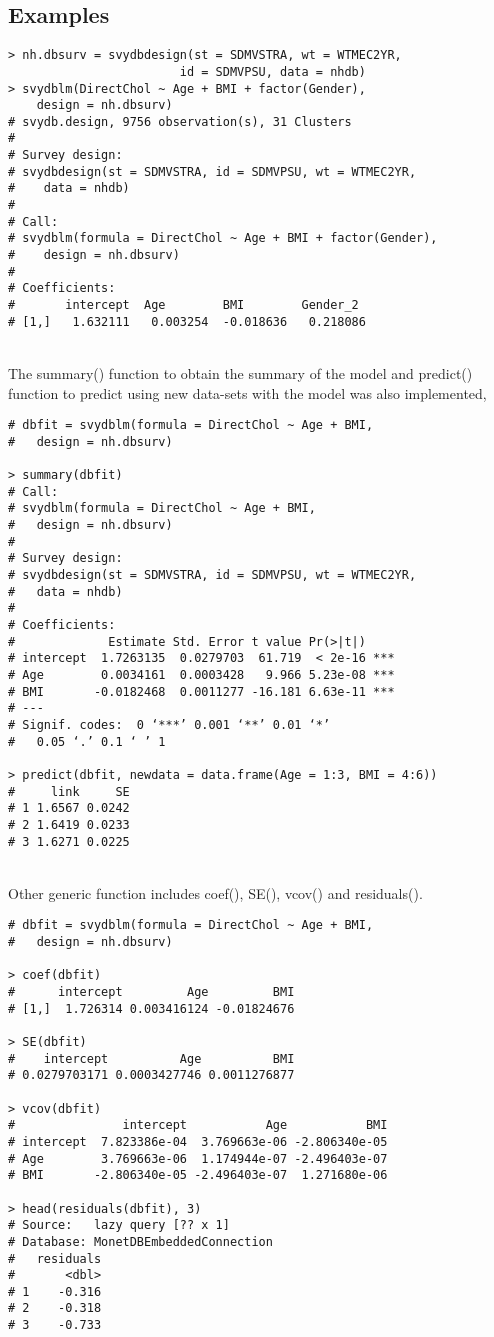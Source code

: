 \newpage
\subsection{Examples}
\begin{lstlisting}
> nh.dbsurv = svydbdesign(st = SDMVSTRA, wt = WTMEC2YR, 
                        id = SDMVPSU, data = nhdb)
> svydblm(DirectChol ~ Age + BMI + factor(Gender), 
    design = nh.dbsurv)
# svydb.design, 9756 observation(s), 31 Clusters
#
# Survey design:
# svydbdesign(st = SDMVSTRA, id = SDMVPSU, wt = WTMEC2YR, 
#    data = nhdb)
#
# Call:
# svydblm(formula = DirectChol ~ Age + BMI + factor(Gender), 
#    design = nh.dbsurv)
#
# Coefficients:
#       intercept  Age        BMI        Gender_2 
# [1,]   1.632111   0.003254  -0.018636   0.218086
\end{lstlisting}

\\
The {\ttfamily summary()} function to obtain the summary of the model and {\ttfamily predict()} function to predict using new data-sets with the model was also implemented,
\\
\begin{lstlisting}
# dbfit = svydblm(formula = DirectChol ~ Age + BMI, 
#   design = nh.dbsurv)

> summary(dbfit)
# Call:
# svydblm(formula = DirectChol ~ Age + BMI,
#   design = nh.dbsurv)
#
# Survey design:
# svydbdesign(st = SDMVSTRA, id = SDMVPSU, wt = WTMEC2YR, 
#   data = nhdb)
#
# Coefficients:
#             Estimate Std. Error t value Pr(>|t|)    
# intercept  1.7263135  0.0279703  61.719  < 2e-16 ***
# Age        0.0034161  0.0003428   9.966 5.23e-08 ***
# BMI       -0.0182468  0.0011277 -16.181 6.63e-11 ***
# ---
# Signif. codes:  0 ‘***’ 0.001 ‘**’ 0.01 ‘*’ 
#   0.05 ‘.’ 0.1 ‘ ’ 1

> predict(dbfit, newdata = data.frame(Age = 1:3, BMI = 4:6))
#     link     SE
# 1 1.6567 0.0242
# 2 1.6419 0.0233
# 3 1.6271 0.0225
\end{lstlisting}
\\\newpage
Other generic function includes {\ttfamily coef()}, {\ttfamily SE()}, {\ttfamily vcov()} and {\ttfamily residuals()}.
\\
\begin{lstlisting}
# dbfit = svydblm(formula = DirectChol ~ Age + BMI, 
#   design = nh.dbsurv)

> coef(dbfit)
#      intercept         Age         BMI
# [1,]  1.726314 0.003416124 -0.01824676

> SE(dbfit)
#    intercept          Age          BMI 
# 0.0279703171 0.0003427746 0.0011276877

> vcov(dbfit)
#               intercept           Age           BMI
# intercept  7.823386e-04  3.769663e-06 -2.806340e-05
# Age        3.769663e-06  1.174944e-07 -2.496403e-07
# BMI       -2.806340e-05 -2.496403e-07  1.271680e-06

> head(residuals(dbfit), 3) 
# Source:   lazy query [?? x 1]
# Database: MonetDBEmbeddedConnection
#   residuals
#       <dbl>
# 1    -0.316
# 2    -0.318
# 3    -0.733
\end{lstlisting}



